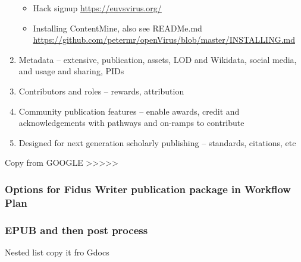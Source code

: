 \documentclass{article}
\begin{document}
\begin{enumerate}
\begin{itemize}
\item Hack signup \href{https://euvsvirus.org/}{https://euvsvirus.org/}


\item Installing ContentMine, also see READMe.md \href{https://github.com/petermr/openVirus/blob/master/INSTALLING.md}{https://github.com/petermr/openVirus/blob/master/INSTALLING.md}


\end{itemize}

\item Metadata – extensive, publication, assets, LOD and Wikidata, social media, and usage and sharing, PIDs


\item Contributors and roles – rewards, attribution


\item Community publication features – enable awards, credit and acknowledgements with pathways and on-ramps to contribute


\item Designed for next generation scholarly publishing – standards, citations, etc


\end{enumerate}




Copy from GOOGLE >>>>>


\subsubsection{\textbf{Options for Fidus Writer publication package in Workflow Plan}}\label{H428481}



\subsubsection{\textbf{EPUB and then post process}}\label{H5347513}



Nested list copy it fro Gdocs
\end{document}
